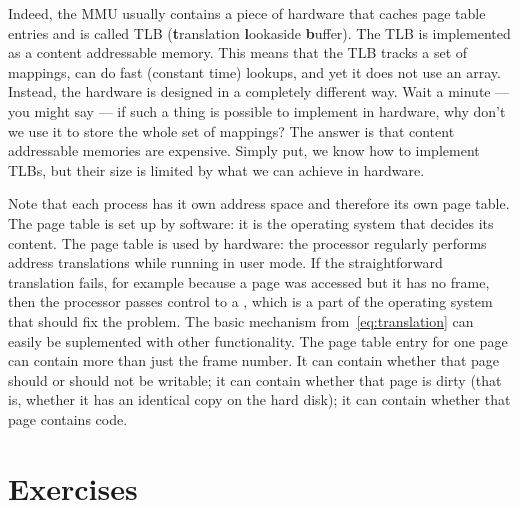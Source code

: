 Indeed, the MMU usually contains a piece of hardware that caches page table entries
  and is called TLB ({\bf t}ranslation {\bf l}ookaside {\bf b}uffer).
The TLB is implemented as a content addressable memory.
This means that the TLB tracks a set of mappings,
  can do fast (constant time) lookups,
  and yet it does not use an array.
Instead, the hardware is designed in a completely different way.
Wait a minute --- you might say ---
  if such a thing is possible to implement in hardware,
  why don't we use it to store the whole set of mappings?
The answer is that content addressable memories are expensive.
Simply put, we know how to implement TLBs,
  but their size is limited by what we can achieve in hardware.

\smallskip

Note that each process has it own address space and therefore its own page table.
The page table is set up by software:
  it is the operating system that decides its content.
The page table is used by hardware:
  the processor regularly performs address translations while running in user mode.
If the straightforward translation fails,
  for example because a page was accessed but it has no frame,
  then the processor passes control to a ,
    which is a part of the operating system that should fix the problem.
The basic mechanism from~\eqref{eq:translation}
  can easily be suplemented with other functionality.
The page table entry for one page can contain more than just the frame number.
It can contain whether that page should or should not be writable;
  it can contain whether that page is dirty
    (that is, whether it has an identical copy on the hard disk);
  it can contain whether that page contains code.





\section{Exercises}

